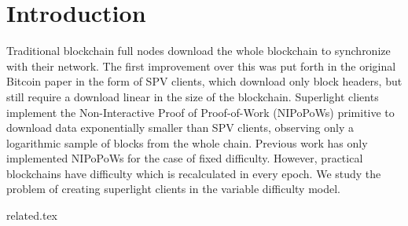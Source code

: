 \section{Introduction}

Traditional blockchain full nodes download the whole blockchain to synchronize
with their network. The first improvement over this was put forth in the
original Bitcoin paper in the form of SPV clients, which download only block
headers, but still require a download linear in the size of the blockchain.
Superlight clients implement the Non-Interactive Proof of Proof-of-Work
(NIPoPoWs) primitive to download data exponentially smaller than SPV clients,
observing only a logarithmic sample of blocks from the whole chain. Previous
work has only implemented NIPoPoWs for the case of fixed difficulty. However,
practical blockchains have difficulty which is recalculated in every epoch. We
study the problem of creating superlight clients in the variable difficulty
model.

{related.tex}
